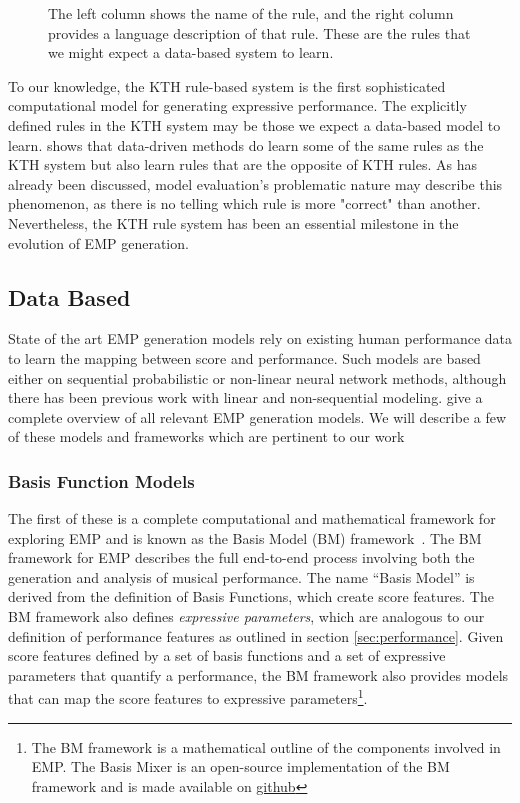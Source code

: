 \begin{figure}
    \centering
    \caption{The left column shows the name of the rule, and the right column provides a language description of that rule. These are the rules that we might expect a data-based system to learn.}
    \label{fig:kth-rules}
\end{figure}

To our knowledge, the KTH rule-based system is the first sophisticated computational model for generating expressive performance. The explicitly defined rules in the KTH system may be those we expect a data-based model to learn. \citet{widmer2002machine} shows that data-driven methods do learn some of the same rules as the KTH system but also learn rules that are the opposite of KTH rules. As has already been discussed, model evaluation's problematic nature may describe this phenomenon, as there is no telling which rule is more "correct" than another. Nevertheless, the KTH rule system has been an essential milestone in the evolution of EMP generation. 

\subsection{Data Based}\label{sec:data-based}
State of the art EMP generation models rely on existing human performance data to learn the mapping between score and performance. Such models are based either on sequential probabilistic or non-linear neural network methods\cite{cancino2018computational}, although there has been previous work with linear and non-sequential modeling. \citet{cancino2018computational} give a complete overview of all relevant EMP generation models. We will describe a few of these models and frameworks which are pertinent to our work

\subsubsection{Basis Function Models}
The first of these is a complete computational and mathematical framework for exploring EMP and is known as the Basis Model (BM) framework~\cite{eduardo2018computational}. The BM framework for EMP describes the full end-to-end process involving both the generation and analysis of musical performance. The name ``Basis Model'' is derived from the definition of Basis Functions, which create score features. The BM framework also defines \emph{expressive parameters}, which are analogous to our definition of performance features as outlined in section \ref{sec:performance}. Given score features defined by a set of basis functions and a set of expressive parameters that quantify a performance, the BM framework also provides models that can map the score features to expressive parameters\footnote{The BM framework is a mathematical outline of the components involved in EMP. The Basis Mixer is an open-source implementation of the BM framework and is made available on \href{https://github.com/OFAI/basismixer}{github}}. 

